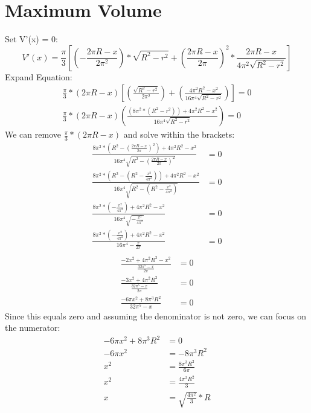 \documentclass{article}
\begin{document}
\section{Maximum Volume}
Set V'(x) = 0:
\begin{displaymath}
    V'(x) = \frac{\pi}{3}\left[\left(-\frac{2\pi R - x}{2\pi^2}\right) * \sqrt{R^2 - r^2} + \left(\frac{2\pi R - x}{2\pi}\right)^2 * \frac{2\pi R - x}{4\pi^2\sqrt{R^2 - r^2}}\right]
\end{displaymath}
Expand Equation:
\begin{align*}
    \frac{\pi}{3}*\left(2\pi R - x\right)\left[\left(\frac{\sqrt{R^2 - r^2}}{2\pi^2}\right) + \left(\frac{4\pi^2 R^2 - x^2}{16\pi^4 \sqrt{R^2 - r^2}}\right)\right] = 0 \\
    \frac{\pi}{3}*\left(2\pi R - x\right)\left(\frac{\left(8\pi^2 * \left(R^2 - r^2\right)\right) + 4\pi^2 R^2 - x^2}{16\pi^4 \sqrt{R^2 - r^2}}\right) = 0 
\end{align*}
We can remove \( \frac{\pi}{3} * (2\pi R - x) \) and solve within the brackets:
\begin{align*}
    \frac{8\pi^2 * \left(R^2 - \left(\frac{2\pi R - x}{2\pi}\right)^2\right) + 4\pi^2 R^2 - x^2}{16\pi^4 \sqrt{R^2 - \left(\frac{2\pi R - x}{2\pi}\right)^2}} &= 0 \\
    \frac{8\pi^2 * \left(R^2 - \left(R^2 - \frac{x^2}{4\pi^2}\right)\right) + 4\pi^2 R^2 - x^2}{16\pi^4 \sqrt{R^2 - \left(R^2 - \frac{x^2}{4\pi^2}\right)}} &= 0 \\
    \frac{8\pi^2 * \left(- \frac{x^2}{4\pi^2}\right) + 4\pi^2 R^2 - x^2}{16\pi^4 \sqrt{- \frac{x^2}{4\pi^2}}} &= 0 \\
    \frac{8\pi^2 * \left(- \frac{x^2}{4\pi^2}\right) + 4\pi^2 R^2 - x^2}{16\pi^4 - \frac{x}{2\pi}} &= 0 \\
\end{align*}
\begin{align*}
    \frac{-2x^2 + 4\pi^2 R^2 - x^2}{\frac{32\pi^5 - x}{2\pi}} &= 0 \\
    \frac{-3x^2 + 4\pi^2 R^2}{\frac{32\pi^5 - x}{2\pi}} &= 0 \\
    \frac{-6\pi x^2 + 8\pi^3 R^2}{32\pi^5 - x} &= 0
\end{align*}
Since this equals zero and assuming the denominator is not zero, we can focus on the numerator:
\begin{align*}
    -6\pi x^2 + 8\pi^3 R^2 &= 0 \\
    -6\pi x^2 &= -8\pi^3 R^2 \\
    x^2 &= \frac{8\pi^3 R^2}{6\pi} \\
    x^2 &= \frac{4\pi^2 R^2}{3} \\
    x &= \sqrt{\frac{4\pi^2}{3}} * R
\end{align*}
\end{document}
